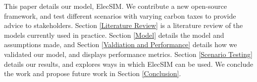 This paper details our model, ElecSIM. We contribute a new open-source framework, and test different scenarios with varying carbon taxes to provide advice to stakeholders. Section \ref{Literature Review} is a literature review of the models currently used in practice. Section \ref{Model} details the model and assumptions made, and Section \ref{Valdiation and Performance} details how we validated our model, and displays performance metrics. Section \ref{Scenario Testing} details our results, and explores ways in which ElecSIM can be used. We conclude the work and propose future work in Section \ref{Conclusion}.


